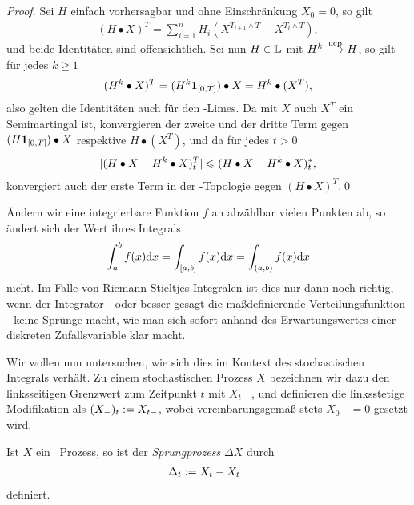 \begin{proof}

Sei $H$ einfach vorhersagbar und ohne Einschränkung $X_0 = 0$, so gilt
\begin{align*}
(H\bullet X)^T = \sum_{i=1}^n H_i(X^{T_{i+1}\wedge T} - X^{T_i\wedge T}), 
\end{align*}
und beide Identitäten sind offensichtlich. Sei nun $H\in \mathbb{L}$ mit $H^k\overset{\text{ucp}}{\longrightarrow} H$,
so gilt für jedes $k\ge 1$
\begin{align*}
(H^k\bullet X)^T = (H^k\mathbf{1}_{[0,T]}) \bullet X = H^k\bullet (X^T),
\end{align*}
also gelten die Identitäten auch für den \ucp-Limes. Da mit $X$ auch $X^T$ ein
Semimartingal ist, konvergieren der zweite und der dritte Term gegen
$(H\mathbf{1}_{[0,T]}) \bullet X$ respektive $H\bullet (X^T)$, und da für jedes $t > 0$
\begin{align*}
\lvert(H\bullet X-H^k\bullet X)^T_t\rvert \leqslant (H\bullet X-H^k\bullet X)_t^*,
\end{align*}
konvergiert auch der erste Term in der \ucp-Topologie gegen $(H\bullet
X)^T$.\qed
\end{proof}


Ändern wir eine integrierbare Funktion $f$ an abzählbar vielen Punkten ab, so
ändert sich der Wert ihres Integrals
\begin{align*}
\int_a^b f(x)\mathrm{d} x = \int_{[a,b]} f(x)\mathrm{d} x =
 \int_{(a,b)} f(x)\mathrm{d} x
\end{align*}
nicht. Im Falle von Riemann-Stieltjes-Integralen ist dies nur dann noch richtig,
wenn der Integrator - oder besser gesagt die maßdefinierende Verteilungsfunktion
- keine Sprünge macht, wie man sich sofort anhand des Erwartungswertes einer diskreten
Zufallsvariable klar macht.

Wir wollen nun untersuchen, wie sich dies im Kontext des stochastischen
Integrals verhält. Zu einem stochastischen Prozess $X$ bezeichnen wir dazu den
linksseitigen Grenzwert zum Zeitpunkt $t$ mit $X_{t-}$, und definieren die
linksstetige Modifikation als $(X_-)_t:= X_{t-}$, wobei vereinbarungsgemäß
stets $X_{0-} = 0$ gesetzt wird.

\begin{defn*}
Ist $X$ ein \cadlag\ Prozess, so ist der \emph{Sprungprozess} $\Delta X$ durch
\begin{align*}
\Delta_t:= X_t -X_{t-}
\end{align*}
definiert.\fish
\end{defn*}

